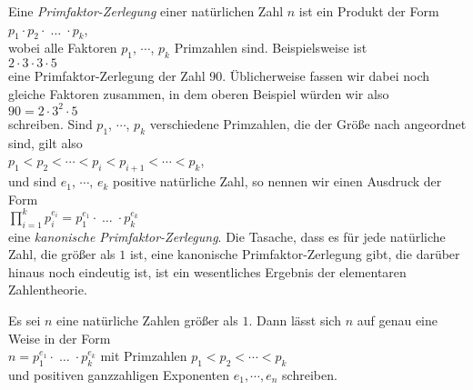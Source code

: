 Eine \emph{Primfaktor-Zerlegung} einer natürlichen Zahl $n$ ist ein Produkt der Form
\\[0.2cm]
\hspace*{1.3cm}
$p_1 \cdot p_2 \cdot\; \dots \;\cdot p_k$,
\\[0.2cm]
wobei alle Faktoren $p_1$, $\cdots$, $p_k$ Primzahlen sind.  Beispielsweise ist
\\[0.2cm]
\hspace*{1.3cm}
$2 \cdot 3 \cdot 3 \cdot 5$
\\[0.2cm]
eine Primfaktor-Zerlegung der Zahl 90.  Üblicherweise fassen wir dabei noch gleiche Faktoren
zusammen, in dem oberen Beispiel würden wir also
\\[0.2cm]
\hspace*{1.3cm}
$90 = 2 \cdot 3^2 \cdot 5$
\\[0.2cm]
schreiben.  Sind $p_1$, $\cdots$, $p_k$ verschiedene Primzahlen, die der Größe nach angeordnet sind,
gilt also
\\[0.2cm]
\hspace*{1.3cm}
$p_1 < p_2 < \cdots < p_{i} < p_{i+1} < \cdots < p_k$,
\\[0.2cm]
und sind $e_1$, $\cdots$, $e_k$ positive natürliche Zahl, so nennen wir einen Ausdruck der Form
\\[0.2cm]
\hspace*{1.3cm}
$\prod\limits_{i=1}^k  p_i^{e_i} = p_1^{e_1} \cdot \;\dots\; \cdot p_k^{e_k}$
\\[0.2cm]
eine \emph{kanonische Primfaktor-Zerlegung}.  Die Tasache, dass es für jede natürliche Zahl, die
größer als $1$ ist, eine kanonische Primfaktor-Zerlegung gibt, die darüber hinaus noch eindeutig
ist,  ist ein wesentliches Ergebnis der elementaren Zahlentheorie.


\begin{Theorem}
\label{theorem:fundamental-arithmetik} \lb
  Es sei $n$ eine natürliche Zahlen größer als $1$.  Dann lässt sich $n$ auf genau eine Weise in der Form
  \\[0.2cm]
  \hspace*{1.3cm}
  $n = p_1^{e_1} \cdot \;\dots\; \cdot p_k^{e_k}$ \quad mit Primzahlen $p_1 < p_2 < \cdots < p_k$
  \\[0.2cm]
  und positiven ganzzahligen Exponenten $e_1, \cdots, e_n$ schreiben.
\end{Theorem}

